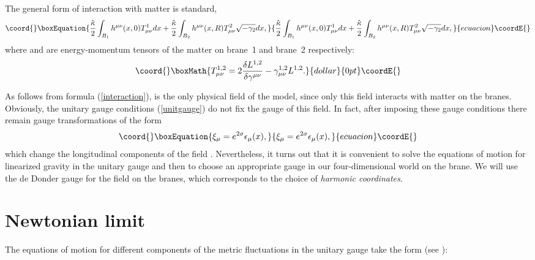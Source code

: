 \documentclass[a4paper,12pt]{article}
\begin{document}
The general form of interaction with matter is standard,
\begin{equation}\coord{}\boxEquation{\label{interaction}
 \frac{\hat \kappa}{2} \int_{B_1} h^{\mu\nu}(x,0) T^1_{\mu\nu} dx +
  \frac{\hat \kappa}{2} \int_{B_2} h^{\mu\nu}(x,R) T^2_{\mu\nu} \sqrt{- \gamma_2} dx,
}{\frac{\hat \kappa}{2} \int_{B_1} h^{\mu\nu}(x,0) T^1_{\mu\nu} dx +
  \frac{\hat \kappa}{2} \int_{B_2} h^{\mu\nu}(x,R) T^2_{\mu\nu} \sqrt{- \gamma_2} dx,
}{ecuacion}\coordE{}\end{equation}
where \coordHE{} and \coordHE{} are energy-momentum
tensors of the matter on brane~1 and brane~2 respectively:
$$\coord{}\boxMath{
 T^{1,2}_{\mu\nu} = 2\frac{\delta L^{1,2}}{\delta  \gamma^{\mu\nu}} -
  \gamma^{1,2}_{\mu\nu}  L^{1,2}.
}{dollar}{0pt}\coordE{}$$

As follows from formula (\ref{interaction}), \coordHE{} is the only
physical field of the model, since only this field interacts with  matter
on the branes. Obviously, the unitary gauge conditions (\ref{unitgauge}) do
not fix the gauge of this field. In fact, after imposing these gauge
conditions there remain gauge transformations of the form
\begin{equation}\coord{}\boxEquation{\label{remgaugetr}
   \xi_\mu = e^{2\sigma}\epsilon_\mu(x),
}{\xi_\mu = e^{2\sigma}\epsilon_\mu(x),
}{ecuacion}\coordE{}\end{equation}
which change the longitudinal components of the field \coordHE{}.
Nevertheless, it turns out that it is convenient to  solve the equations of
motion for linearized gravity in the unitary gauge and then to  choose an
appropriate gauge  in our four-dimensional world on the brane. We will use
the de Donder gauge for the field \coordHE{}  on the branes, which
corresponds  to the choice of  {\it harmonic coordinates}.

\section{Newtonian limit}
The equations of motion  for different components of the metric
fluctuations in the unitary gauge take the form (see \cite{BKSV}):
\end{document}

